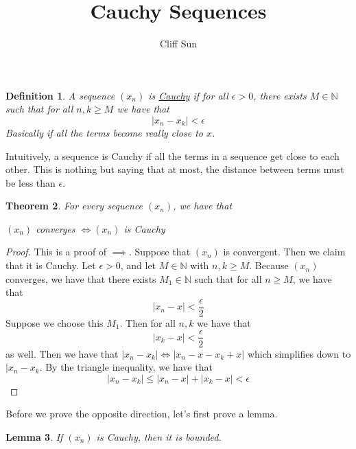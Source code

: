 \documentclass{article}
\title{Cauchy Sequences}
\author{Cliff Sun}
\newtheorem{theorem}{Theorem}[section]
\newtheorem{lemma}[theorem]{Lemma}
\newtheorem{definition}[theorem]{Definition}
\newtheorem{one minute paper}[theorem]{One Minute Paper}
\begin{document}
\maketitle

\begin{definition}
    A sequence $(x_n)$ is \underline{Cauchy} if for all $\epsilon > 0$, there exists $M \in \mathbb{N}$ such that for all $n,k \geq M$ we have that 
    \begin{equation}
        |x_n - x_k| < \epsilon
    \end{equation}
    Basically if all the terms become really close to $x$.
\end{definition}

Intuitively, a sequence is Cauchy if all the terms in a sequence get close to each other. This is nothing but saying that at most, the distance between terms must be less than $\epsilon$. 

\begin{theorem}
    For every sequence $(x_n)$, we have that 
    \begin{center}
        $(x_n)$ converges $\iff (x_n)$ is Cauchy
    \end{center}
\end{theorem}

\begin{proof}
    This is a proof of $\implies$. Suppose that $(x_n)$ is convergent. Then we claim that it is Cauchy. Let $\epsilon > 0$, and let $M \in \mathbb{N}$ with $n, k \geq M$. Because $(x_n)$ converges, we have that 
    there exists $M_1 \in \mathbb{N}$ such that for all $n \geq M$, we have that 
    \begin{equation}
        |x_n - x| < \frac{\epsilon}{2}
    \end{equation}
    Suppose we choose this $M_1$. Then for all $n, k$ we have that 
    \begin{equation}
        |x_k - x| < \frac{\epsilon}{2}
    \end{equation}
    as well. Then we have that $|x_n - x_k| \iff |x_n - x - x_k + x|$ which simplifies down to $|x_n - x_k$. By the triangle inequality, we have that
    \begin{equation}
        |x_n - x_k| \leq |x_n - x| + |x_k - x| < \epsilon
    \end{equation}
\end{proof}

Before we prove the opposite direction, let's first prove a lemma. 

\begin{lemma}
    If $(x_n)$ is Cauchy, then it is bounded. 
\end{lemma}
\end{document}
